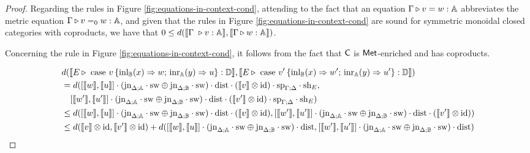 \documentclass[10pt,a4paper]{amsart}
\theoremstyle{definition}
\theoremstyle{definition}
\theoremstyle{definition}
\theoremstyle{definition}
\theoremstyle{definition}
\theoremstyle{definition}
\begin{document}
\begin{proof}
  Regarding the rules in Figure \ref{fig:equations-in-context-cond}, attending to the fact that an equation $\Gamma \triangleright v=w: \mathbb{A}$ abbreviates the metric equation $\Gamma \triangleright v =_0 w: \mathbb{A}$, and given that the rules in Figure \ref{fig:equations-in-context-cond} are sound for symmetric monoidal closed categories with coproducts, we have that $0 \leq d( \llbracket \Gamma  \vljud v : \typeA \rrbracket, \llbracket\Gamma \vljud w : \typeA \rrbracket)$.  

 Concerning the rule in Figure \ref{fig:equations-in-context-cond}, it follows from the fact that $\mathsf{C}$ is $\mathsf{Met}$-enriched and has coproducts.

  \begin{align*}
    & d( \llbracket E  \vljud \text{ case } v \, \{\text{inl}_{\typeB}  (x) \Rightarrow w ; \, \text{inr}_{\typeA} (y) \Rightarrow u\} : \typeD \rrbracket, \llbracket E \vljud \text{ case } v' \, \{\text{inl}_{\typeB}  (x) \Rightarrow w' ; \, \text{inr}_{\typeA} (y) \Rightarrow u'\} : \typeD \rrbracket)  \\
    & = d( [\llbracket w\rrbracket ,\llbracket u\rrbracket] \comp (\text{jn}_{\Delta;\typeA}\comp \sw \oplus \text{jn}_{\Delta;\typeB}\comp \sw) \comp \dist \comp (\llbracket v\rrbracket \otimes \text{id}) \comp \text{sp}_{\Gamma;\Delta} \comp \text{sh}_{E}, \\
    & \hspace{10pt} [\llbracket w'\rrbracket ,\llbracket u'\rrbracket] \comp (\text{jn}_{\Delta;\typeA}\comp \sw \oplus \text{jn}_{\Delta;\typeB}\comp \sw) \comp \dist \comp (\llbracket v'\rrbracket \otimes \text{id}) \comp \text{sp}_{\Gamma;\Delta} \comp \text{sh}_{E})\\
    & \leq d( [\llbracket w\rrbracket ,\llbracket u\rrbracket] \comp (\text{jn}_{\Delta;\typeA}\comp \sw \oplus \text{jn}_{\Delta;\typeB}\comp \sw) \comp \dist \comp (\llbracket v\rrbracket \otimes \text{id}),  [\llbracket w'\rrbracket ,\llbracket u'\rrbracket] \comp (\text{jn}_{\Delta;\typeA}\comp \sw \oplus \text{jn}_{\Delta;\typeB}\comp \sw) \comp \dist \comp (\llbracket v'\rrbracket \otimes \text{id}) )\\
    & \leq d(\llbracket v\rrbracket \otimes \text{id}, \llbracket v'\rrbracket \otimes \text{id}) +  d( [\llbracket w\rrbracket ,\llbracket u\rrbracket] \comp (\text{jn}_{\Delta;\typeA}\comp \sw \oplus \text{jn}_{\Delta;\typeB}\comp \sw) \comp \dist,  [\llbracket w'\rrbracket ,\llbracket u'\rrbracket] \comp (\text{jn}_{\Delta;\typeA}\comp \sw \oplus \text{jn}_{\Delta;\typeB}\comp \sw) \comp \dist) \\

\end{align*}
\end{proof}
\end{document}
